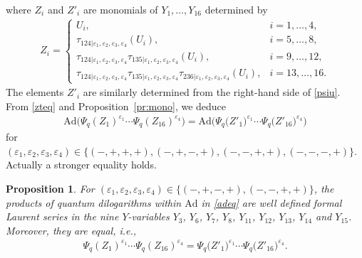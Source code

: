 \documentclass[pdftex]{sigma}
\numberwithin{equation}{section}
\newtheorem{Proposition}[Theorem]{Proposition}
 { \theoremstyle{definition}
\newtheorem{Example}[Theorem]{Example}
\newtheorem{Remark}[Theorem]{Remark} }
\begin{document}
where $Z_i$ and $Z'_i$ are monomials of $Y_1, \dots, Y_{16}$
determined by
\begin{align}\label{zu}
Z_i = \begin{cases} U_i, & i = 1,\dotsc, 4,
\\
 \tau_{124|\varepsilon_1,\varepsilon_2,\varepsilon_3,\varepsilon_4}
 (U_i), & i=5,\dotsc, 8,
\\
\tau_{124|\varepsilon_1,\varepsilon_2,\varepsilon_3,\varepsilon_4}
\tau_{135|\varepsilon_1,\varepsilon_2,\varepsilon_3,\varepsilon_4}
(U_i), & i=9, \ldots, 12,
\\
\tau_{124|\varepsilon_1,\varepsilon_2,\varepsilon_3,\varepsilon_4}
\tau_{135|\varepsilon_1,\varepsilon_2,\varepsilon_3,\varepsilon_4}
\tau_{236|\varepsilon_1,\varepsilon_2,\varepsilon_3,\varepsilon_4}
(U_i), & i=13, \ldots, 16.
\end{cases}
\end{align}
The elements $Z'_i$ are similarly determined from the
right-hand side of \eqref{psiu}.
%
From \eqref{zteq} and Proposition~\ref{pr:mono}, we deduce
\begin{align}\label{adeq}
\mathrm{Ad}\bigl(\Psi_q(Z_1)^{\varepsilon_1}\cdots \Psi_q(Z_{16})^{\varepsilon_{4}}\bigr)
=\mathrm{Ad}\bigl(\Psi_q\bigl(Z'_1\bigr)^{\varepsilon_1}\cdots \Psi_q\bigl(Z'_{16}\bigr)^{\varepsilon_{4}}\bigr)
\end{align}
for $(\varepsilon_1,\varepsilon_2,\varepsilon_3,\varepsilon_4) \in
\{(-,+,+,+), (-,+,-,+), (-,-,+,+), (-,-,-,+)\}$.
Actually a stronger equality holds.

\begin{Proposition}\label{pr:dilog}
For $(\varepsilon_1,\varepsilon_2,\varepsilon_3,\varepsilon_4) \in \{(-,+,-,+), (-,-,+,+)\}$,
the products of quantum dilogarithms within $\mathrm{Ad}$ in \eqref{adeq}
are well defined formal Laurent series in
the nine $Y$-variables
$Y_3$, $Y_6$, $Y_7$, $Y_8$, $Y_{11}$, $Y_{12}$, $Y_{13}$, $Y_{14}$ and $Y_{15}$.
Moreover, they are equal, i.e.,
\begin{align}\label{pseq}
\Psi_q(Z_1)^{\varepsilon_1}\dotsm \Psi_q(Z_{16})^{\varepsilon_{4}}
=
\Psi_q\bigl(Z'_1\bigr)^{\varepsilon_1}\dotsm \Psi_q\bigl(Z'_{16}\bigr)^{\varepsilon_{4}}.
\end{align}
\end{Proposition}
\end{document}
